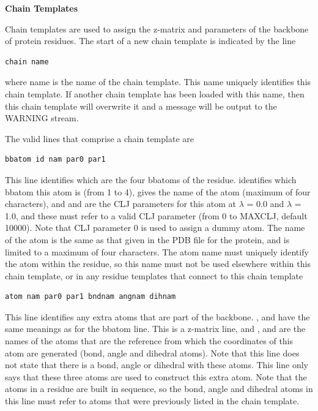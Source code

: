 \documentclass[letterpaper,10pt,english]{manual}
\begin{document}
\textbf{Chain Templates}

Chain templates are used to assign the z-matrix and parameters of the backbone of protein residues. The start of a new chain template is indicated by the line

\begin{Verbatim}[commandchars=@\[\]]
chain name
\end{Verbatim}

where name is the name of the chain template. This name uniquely identifies this chain template. If another chain template has been loaded with this name, then this chain template will overwrite it and a message will be output to the WARNING stream.

The valid lines that comprise a chain template are

\begin{Verbatim}[commandchars=@\[\]]
bbatom id nam par0 par1
\end{Verbatim}

This line identifies which are the four bbatoms of the residue.  identifies which bbatom this atom is (from 1 to 4),  gives the name of the atom (maximum of four characters), and  and  are the CLJ parameters for this atom at $\lambda$ = 0.0 and $\lambda$ = 1.0, and these must refer to a valid CLJ parameter (from 0 to MAXCLJ, default 10000). Note that CLJ parameter 0 is used to assign a dummy atom. The name of the atom is the same as that given in the PDB file for the protein, and is limited to a maximum of four characters. The atom name must uniquely identify the atom within the residue, so this name must not be used elsewhere within this chain template, or in any residue templates that connect to this chain template

\begin{Verbatim}[commandchars=@\[\]]
atom nam par0 par1 bndnam angnam dihnam
\end{Verbatim}

This line identifies any extra atoms that are part of the backbone. ,  and  have the same meanings as for the bbatom line. This is a z-matrix line, and ,  and  are the names of the atoms that are the reference from which the coordinates of this atom are generated (bond, angle and dihedral atoms). Note that this line does not state that there is a bond, angle or dihedral with these atoms. This line only says that these three atoms are used to construct this extra atom. Note that the atoms in a residue are built in sequence, so the bond, angle and dihedral atoms in this line must refer to atoms that were previously listed in the chain template.
\end{document}
